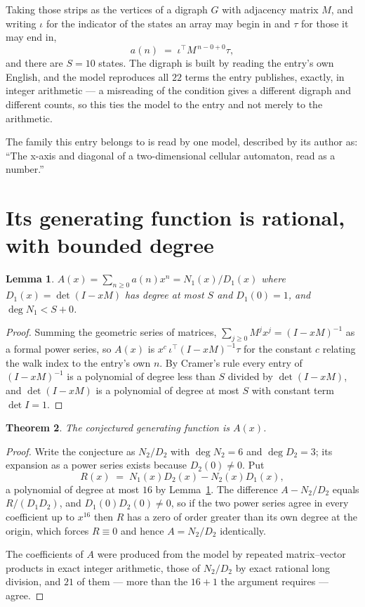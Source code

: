 \documentclass[11pt,a4paper]{article}
\theoremstyle{plain}
\newtheorem{theorem}{Theorem}
\newtheorem{lemma}[theorem]{Lemma}
\theoremstyle{definition}
\begin{document}
Taking those strips as the vertices of a digraph $G$ with adjacency matrix $M$, and writing
$\iota$ for the indicator of the states an array may begin in and $\tau$ for those it may end
in,
\[
a(n)\;=\;\iota^{\!\top}M^{\,n-0+0}\tau ,
\]
and there are $S=10$ states. The digraph is built by reading the entry's own English, and the
model reproduces all $22$ terms the entry publishes, exactly, in integer arithmetic --- a
misreading of the condition gives a different digraph and different counts, so this ties the
model to the entry and not merely to the arithmetic.

The family this entry belongs to is read by one model, described by its author as: ``The x-axis and diagonal of a two-dimensional cellular automaton, read as a number.''


\section{Its generating function is rational, with bounded degree}

\begin{lemma}\label{lem:rat}
$A(x)=\sum_{n\ge0}a(n)x^n=N_1(x)/D_1(x)$ where $D_1(x)=\det(I-xM)$ has degree at most
$S$ and $D_1(0)=1$, and $\deg N_1<S+0$.
\end{lemma}

\begin{proof}
Summing the geometric series of matrices, $\sum_{j\ge0}M^jx^j=(I-xM)^{-1}$ as a formal
power series, so $A(x)$ is $x^{c}\,\iota^{\!\top}(I-xM)^{-1}\tau$ for the constant $c$
relating the walk index to the entry's own $n$. By Cramer's rule every entry of
$(I-xM)^{-1}$ is a polynomial of degree less than $S$ divided by $\det(I-xM)$, and
$\det(I-xM)$ is a polynomial of degree at most $S$ with constant term $\det I=1$.
\end{proof}

\begin{theorem}
The conjectured generating function is $A(x)$.
\end{theorem}

\begin{proof}
Write the conjecture as $N_2/D_2$ with $\deg N_2=6$ and $\deg D_2=3$; its expansion as a
power series exists because $D_2(0)\neq0$. Put
\[
R(x)\;=\;N_1(x)D_2(x)-N_2(x)D_1(x),
\]
a polynomial of degree at most $16$ by Lemma~\ref{lem:rat}. The difference
$A-N_2/D_2$ equals $R/(D_1D_2)$, and $D_1(0)D_2(0)\neq0$, so if the two power series agree in
every coefficient up to $x^{16}$ then $R$ has a zero of order greater than its own
degree at the origin, which forces $R\equiv0$ and hence $A=N_2/D_2$ identically.

The coefficients of $A$ were produced from the model by repeated matrix--vector products in
exact integer arithmetic, those of $N_2/D_2$ by exact rational long division, and $21$
of them --- more than the $16+1$ the argument requires --- agree.
\end{proof}
\end{document}

